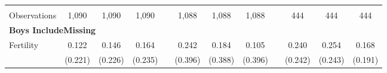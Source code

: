 \begin{landscape}
\begin{table}[htpb!]
\begin{center}
\begin{tabular}{lcccp{2mm}cccp{2mm}ccc}
\begin{footnotesize}\end{footnotesize}&\begin{footnotesize}\end{footnotesize}&\begin{footnotesize}\end{footnotesize}&\begin{footnotesize}\end{footnotesize}&\begin{footnotesize}\end{footnotesize}&\begin{footnotesize}\end{footnotesize}&\begin{footnotesize}\end{footnotesize}&\begin{footnotesize}\end{footnotesize}&\begin{footnotesize}\end{footnotesize}&\begin{footnotesize}\end{footnotesize}&\begin{footnotesize}\end{footnotesize}&\begin{footnotesize}\end{footnotesize}\\Observations&1,090&1,090&1,090&&1,088&1,088&1,088&&444&444&444\\
\multicolumn{12}{l}{\textbf{Boys IncludeMissing}}\\ 
Fertility&0.122&0.146&0.164&&0.242&0.184&0.105&&0.240&0.254&0.168\\
&(0.221)&(0.226)&(0.235)&&(0.396)&(0.388)&(0.396)&&(0.242)&(0.243)&(0.191)\\

\end{tabular}
\end{center}
\end{table}
\end{landscape}
